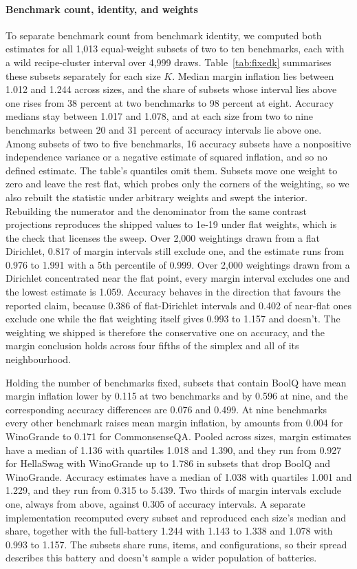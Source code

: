 \paragraph{Benchmark count, identity, and weights}
\label{app:composition}
To separate benchmark count from benchmark identity, we computed both estimates for all 1,013 equal-weight subsets of two to ten benchmarks, each with a wild recipe-cluster interval over 4,999 draws. Table~\ref{tab:fixedk} summarises these subsets separately for each size $K$. Median margin inflation lies between 1.012 and 1.244 across sizes, and the share of subsets whose interval lies above one rises from 38 percent at two benchmarks to 98 percent at eight. Accuracy medians stay between 1.017 and 1.078, and at each size from two to nine benchmarks between 20 and 31 percent of accuracy intervals lie above one. Among subsets of two to five benchmarks, 16 accuracy subsets have a nonpositive independence variance or a negative estimate of squared inflation, and so no defined estimate. The table's quantiles omit them. Subsets move one weight to zero and leave the rest flat, which probes only the corners of the weighting, so we also rebuilt the statistic under arbitrary weights and swept the interior. Rebuilding the numerator and the denominator from the same contrast projections reproduces the shipped values to 1e-19 under flat weights, which is the check that licenses the sweep. Over 2,000 weightings drawn from a flat Dirichlet, 0.817 of margin intervals still exclude one, and the estimate runs from 0.976 to 1.991 with a 5th percentile of 0.999. Over 2,000 weightings drawn from a Dirichlet concentrated near the flat point, every margin interval excludes one and the lowest estimate is 1.059. Accuracy behaves in the direction that favours the reported claim, because 0.386 of flat-Dirichlet intervals and 0.402 of near-flat ones exclude one while the flat weighting itself gives 0.993 to 1.157 and doesn't. The weighting we shipped is therefore the conservative one on accuracy, and the margin conclusion holds across four fifths of the simplex and all of its neighbourhood.

Holding the number of benchmarks fixed, subsets that contain BoolQ have mean margin inflation lower by 0.115 at two benchmarks and by 0.596 at nine, and the corresponding accuracy differences are 0.076 and 0.499. At nine benchmarks every other benchmark raises mean margin inflation, by amounts from 0.004 for WinoGrande to 0.171 for CommonsenseQA. Pooled across sizes, margin estimates have a median of 1.136 with quartiles 1.018 and 1.390, and they run from 0.927 for HellaSwag with WinoGrande up to 1.786 in subsets that drop BoolQ and WinoGrande. Accuracy estimates have a median of 1.038 with quartiles 1.001 and 1.229, and they run from 0.315 to 5.439. Two thirds of margin intervals exclude one, always from above, against 0.305 of accuracy intervals. A separate implementation recomputed every subset and reproduced each size's median and share, together with the full-battery 1.244 with 1.143 to 1.338 and 1.078 with 0.993 to 1.157. The subsets share runs, items, and configurations, so their spread describes this battery and doesn't sample a wider population of batteries.

